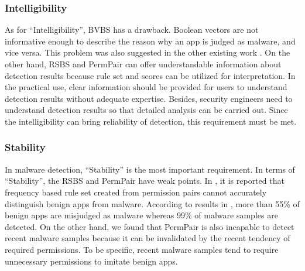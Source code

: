 \documentclass{ieeeaccess}
\begin{document}
\subsubsection{Intelligibility}
As for ``Intelligibility'', BVBS \cite{liu2014two} has a drawback.
Boolean vectors are not informative enough to describe the reason why an app is judged as malware, and vice versa.
This problem was also suggested in the other existing work \cite{wang2014exploring}.
On the other hand, RSBS \cite{liang2014permission} and PermPair \cite{arora2019permpair} can offer understandable information about detection results because rule set and scores can be utilized for interpretation.
In the practical use, clear information should be provided for users to understand detection results without adequate expertise.
Besides, security engineers need to understand detection results so that detailed analysis can be carried out.
Since the intelligibility can bring reliability of detection, this requirement must be met.

\subsubsection{Stability}
In malware detection, ``Stability'' is the most important requirement.
In terms of ``Stability'', the RSBS \cite{liang2014permission} and PermPair \cite{arora2019permpair} have weak points.
In \cite{liang2014permission}, it is reported that frequency based rule set created from permission pairs cannot accurately distinguish benign apps from malware.
According to results in \cite{liang2014permission}, more than 55\% of benign apps are misjudged as malware whereas 99\% of malware samples are detected.
On the other hand, we found that PermPair \cite{arora2019permpair} is also incapable to detect recent malware samples because it can be invalidated by the recent tendency of required permissions.
To be specific, recent malware samples tend to require unnecessary permissions to imitate benign apps.
\end{document}

